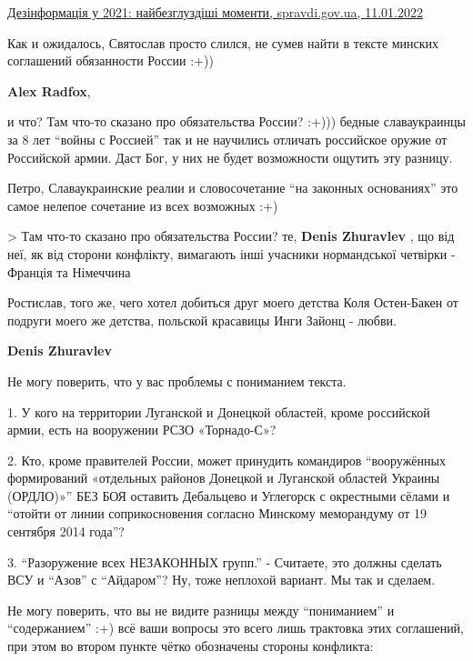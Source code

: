 \begin{itemize}
\begin{itemize}
\href{https://spravdi.gov.ua/dezinformacziya-u-2021-najbezgluzdishi-momenty}{%
Дезінформація у 2021: найбезглуздіші моменти, spravdi.gov.ua, 11.01.2022%
}

Как и ожидалось, Святослав просто слился, не сумев найти в тексте минских соглашений обязанности России :+))

\textbf{Alex Radfox}, 

и что? Там что-то сказано про обязательства России? :+))) бедные славаукраинцы
за 8 лет \enquote{войны с Россией} так и не научились отличать российское оружие от
Российской армии. Даст Бог, у них не будет возможности ощутить эту разницу.


Петро, Славаукраинские реалии и словосочетание \enquote{на законных основаниях} это самое нелепое сочетание из всех возможных :+)

> Там что-то сказано про обязательства России?
те, \textbf{Denis Zhuravlev} , що від неї, як від сторони конфлікту, вимагають інші учасники нормандської четвірки - Франція та Німеччина


Ростислав, того же, чего хотел добиться друг моего детства Коля Остен-Бакен от
подруги моего же детства, польской красавицы Инги Зайонц - любви.


\textbf{Denis Zhuravlev} 

Не могу поверить, что у вас проблемы с пониманием текста.

1. У кого на территории Луганской и Донецкой областей, кроме российской армии,
есть на вооружении РСЗО «Торнадо-С»?

2. Кто, кроме правителей России, может принудить командиров \enquote{вооружённых
формирований «отдельных районов Донецкой и Луганской областей Украины (ОРДЛО)»}
БЕЗ БОЯ оставить Дебальцево и Углегорск с окрестными сёлами и \enquote{отойти от линии
соприкосновения согласно Минскому меморандуму от 19 сентября 2014 года}?

3. \enquote{Разоружение всех НЕЗАКОННЫХ групп.} - Считаете, это должны сделать ВСУ и
\enquote{Азов} с \enquote{Айдаром}? Ну, тоже неплохой вариант. Мы так и сделаем.


Не могу поверить, что вы не видите разницы между \enquote{пониманием} и
\enquote{содержанием} :+) всё ваши вопросы это всего лишь трактовка этих
соглашений, при этом во втором пункте чётко обозначены стороны конфликта:


\end{itemize}
\end{itemize}
